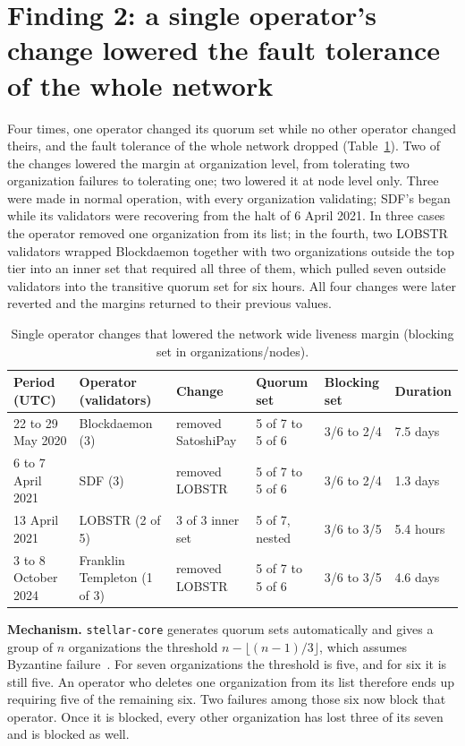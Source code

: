 \documentclass[11pt,a4paper]{article}
\newcommand{\toolname}[1]{\texttt{#1}}
\begin{document}
\section{Finding 2: a single operator's change lowered the fault tolerance of the whole network}
Four times, one operator changed its quorum set while no other operator changed theirs, and the fault tolerance of the whole network dropped (Table~\ref{tab:config}). Two of the changes lowered the margin at organization level, from tolerating two organization failures to tolerating one; two lowered it at node level only. Three were made in normal operation, with every organization validating; SDF's began while its validators were recovering from the halt of 6 April 2021. In three cases the operator removed one organization from its list; in the fourth, two LOBSTR validators wrapped Blockdaemon together with two organizations outside the top tier into an inner set that required all three of them, which pulled seven outside validators into the transitive quorum set for six hours. All four changes were later reverted and the margins returned to their previous values.

\begin{table}[h]
\centering
\small
\setlength{\tabcolsep}{4pt}
\begin{tabular}{@{}llllll@{}}
\toprule
Period (UTC) & Operator (validators) & Change & Quorum set & Blocking set & Duration \\
\midrule
22 to 29 May 2020 & Blockdaemon (3) & removed SatoshiPay & 5 of 7 to 5 of 6 & 3/6 to 2/4 & 7.5 days \\
6 to 7 April 2021 & SDF (3) & removed LOBSTR & 5 of 7 to 5 of 6 & 3/6 to 2/4 & 1.3 days \\
13 April 2021 & LOBSTR (2 of 5) & 3 of 3 inner set & 5 of 7, nested & 3/6 to 3/5 & 5.4 hours \\
3 to 8 October 2024 & Franklin Templeton (1 of 3) & removed LOBSTR & 5 of 7 to 5 of 6 & 3/6 to 3/5 & 4.6 days \\
\bottomrule
\end{tabular}
\caption{Single operator changes that lowered the network wide liveness margin (blocking set in organizations/nodes).}
\label{tab:config}
\end{table}

\textbf{Mechanism.} \toolname{stellar-core} generates quorum sets automatically and gives a group of $n$ organizations the threshold $n-\lfloor (n-1)/3 \rfloor$, which assumes Byzantine failure~\cite{configuring,corecfg}. For seven organizations the threshold is five, and for six it is still five. An operator who deletes one organization from its list therefore ends up requiring five of the remaining six. Two failures among those six now block that operator. Once it is blocked, every other organization has lost three of its seven and is blocked as well.
\end{document}
